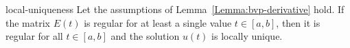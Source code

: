 \begin{Theorem}{local-uniqueness}
    Let the
  assumptions of Lemma~\ref{Lemma:bvp-derivative} hold. If the matrix $E(t)$ is
  regular for at least a single value $t\in [a,b]$, then it is regular
  for all $t\in [a,b]$ and the solution $u(t)$ is locally unique.
\end{Theorem}
